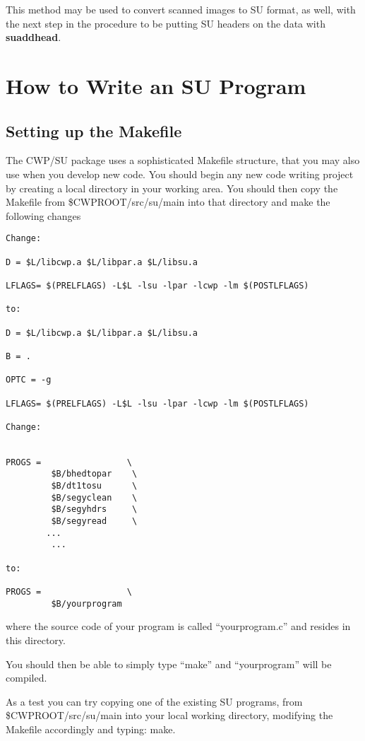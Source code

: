 {{{{{{{\begin{rmans}
This method may be used to convert scanned images to {\small\sf SU\/} format,
as well, with the next step in the procedure to be putting {\small\sf SU\/}
headers on the data with  {\bf suaddhead}.
\end{rmans}


\chapter{How to Write an SU Program}

\section{Setting up the Makefile}

The CWP/SU package uses a sophisticated Makefile structure, that you may also
use when you develop new code. You should begin any new code writing project by
creating a local directory in your working area.
You should then copy the Makefile from \$CWPROOT/src/su/main into that directory
and make the following changes
\begin{verbatim}
Change:

D = $L/libcwp.a $L/libpar.a $L/libsu.a

LFLAGS= $(PRELFLAGS) -L$L -lsu -lpar -lcwp -lm $(POSTLFLAGS)

to:

D = $L/libcwp.a $L/libpar.a $L/libsu.a

B = .

OPTC = -g

LFLAGS= $(PRELFLAGS) -L$L -lsu -lpar -lcwp -lm $(POSTLFLAGS)

Change:


PROGS =                 \
         $B/bhedtopar    \
         $B/dt1tosu      \
         $B/segyclean    \
         $B/segyhdrs     \
         $B/segyread     \
        ...
         ...

to:

PROGS =                 \
         $B/yourprogram
\end{verbatim}
where the source code of your program is called  ``yourprogram.c'' and resides in
this directory.


You should then  be able to  simply type ``make'' and ``yourprogram'' will be compiled.

As a test you can try copying one of the existing SU programs, from \$CWPROOT/src/su/main
into your local working directory, modifying the Makefile accordingly and typing: make.

}}}}}}}
